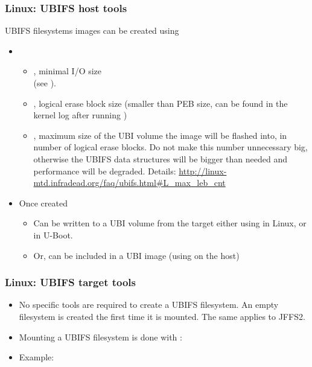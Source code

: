 \begin{frame}
  \frametitle{Linux: UBIFS host tools}
  UBIFS filesystems images can be created using 
    \begin{itemize}
    \item {}
      \begin{itemize}
      \item {}, minimal I/O size\\
                 (see ).
      \item {}, logical erase block size (smaller than
                 PEB size, can be found in the kernel log after running
		 )
      \item {}, maximum size of the UBI volume the image
        will be flashed into, in number of logical erase blocks.
        Do not make this number unnecessary big, otherwise the UBIFS
        data structures will be bigger than needed and performance
        will be degraded. Details:
        {\scriptsize\url{http://linux-mtd.infradead.org/faq/ubifs.html\#L_max_leb_cnt}}
      \end{itemize}
    \item Once created
      \begin{itemize}
      \item Can be written to a UBI volume from the target either using
         in Linux, or  in U-Boot.
      \item Or, can be included in a UBI image (using 
        on the host)
      \end{itemize}
    \end{itemize}
\end{frame}

\begin{frame}
  \frametitle{Linux: UBIFS target tools}
  \begin{itemize}
  \item No specific tools are required to create a UBIFS filesystem.
	An empty filesystem is created the first time it is mounted.
        The same applies to JFFS2.
  \item Mounting a UBIFS filesystem is done with :\\
  \item Example:\\
  \end{itemize}
\end{frame}

